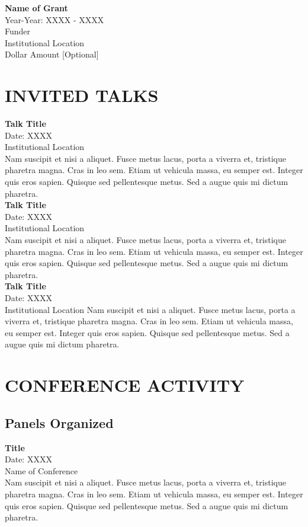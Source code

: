 \documentclass{article}
\begin{document}
\noindent
\textbf{Name of Grant} \\ 
Year-Year: XXXX - XXXX\\
Funder \\
Institutional Location \\
Dollar Amount [Optional]  


\section*{INVITED TALKS}

\noindent
\newline 
\textbf{Talk Title} \\ 
Date: XXXX \\
Institutional Location \\
Nam suscipit et nisi a aliquet. Fusce metus lacus, porta a viverra et, tristique pharetra magna. Cras in leo sem. Etiam ut vehicula massa, eu semper est. Integer quis eros sapien. Quisque sed pellentesque metus. Sed a augue quis mi dictum pharetra. \\

\noindent
\textbf{Talk Title} \\ 
Date: XXXX \\
Institutional Location \\
Nam suscipit et nisi a aliquet. Fusce metus lacus, porta a viverra et, tristique pharetra magna. Cras in leo sem. Etiam ut vehicula massa, eu semper est. Integer quis eros sapien. Quisque sed pellentesque metus. Sed a augue quis mi dictum pharetra. \\

\noindent
\textbf{Talk Title} \\ 
Date: XXXX \\
Institutional Location 
Nam suscipit et nisi a aliquet. Fusce metus lacus, porta a viverra et, tristique pharetra magna. Cras in leo sem. Etiam ut vehicula massa, eu semper est. Integer quis eros sapien. Quisque sed pellentesque metus. Sed a augue quis mi dictum pharetra. 


\section*{CONFERENCE ACTIVITY}
\subsection*{Panels Organized}
\textbf{Title} \\
Date: XXXX \\
Name of Conference \\
Nam suscipit et nisi a aliquet. Fusce metus lacus, porta a viverra et, tristique pharetra magna. Cras in leo sem. Etiam ut vehicula massa, eu semper est. Integer quis eros sapien. Quisque sed pellentesque metus. Sed a augue quis mi dictum pharetra. 
\end{document}
